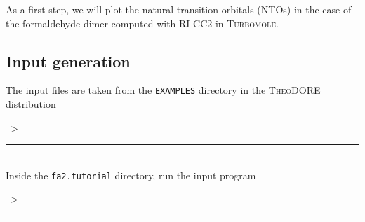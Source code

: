 \documentclass[DIV=12,headings=normal]{scrartcl}
\newcommand\Cline[2][red]{{\sbox\MBox{#2}%
  \rlap{\usebox\MBox}\color{#1}\rule[-1.2\dp\MBox]{\wd\MBox}{0.5pt}}}
\newcommand{\redl}[1]{\Cline{\textcolor{red}{#1}}}
\newcommand{\comm}[1]{
\small
~> \redl{#1}
\normalsize
}
\newcommand{\theo}{\textsc{TheoDORE}}
\begin{document}
As a first step, we will plot the natural transition orbitals (NTOs) in the case of the formaldehyde dimer computed with RI-CC2 in \textsc{Turbomole}.

\subsection{Input generation}
\label{sec:inpnto}

The input files are taken from the \texttt{EXAMPLES} directory in the \theo{} distribution

\comm{cp -r \$THEODIR/EXAMPLES/fa2.ricc2/QC\_FILES/ fa2.tutorial} \\

Inside the \texttt{fa2.tutorial} directory, run the input program

\comm{theoinp}
\end{document}
